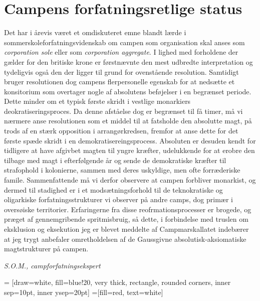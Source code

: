 \begin{minipage}[b]{0.95\linewidth}
\begin{minipage}[t]{0.47\textwidth}
\section*{Campens forfatningsretlige status}
Det har i årevis været et omdiskuteret emne blandt lærde i sommerskoleforfatningsvidenskab om campen som organisation skal anses som \emph{corporation sole} eller som \emph{corporation aggregate}. I lighed med forholdene der gælder for den britiske krone er førstnævnte den mest udbredte interpretation og tydeligvis også den der ligger til grund for ovenstående resolution. Samtidigt bruger resolutionen dog campens flerpersonelle egenskab for at nedsætte et konsitorium som overtager nogle af absolutens beføjelser i en begrænset periode. Dette minder om et typisk første skridt i vestlige monarkiers deokratiseringsproces. Da denne afståelse dog er begrænset til få timer, må vi nærmere anse resolutionen som et middel til at fatsholde den absolutte magt, på trods af en stærk opposition i arrangørkredsen, fremfor at anse dette for det første spæde skridt i en demokratisereingsprocess. Absoluten er desuden kendt for tidligere at have afgivbet magten til yngre kræfter, udelukkende for at erobre den tilbage med magt i efterfølgende år og sende de demokratiske kræfter til strafophold i kolonierne, sammen med deres uskyldige, men ofte forræderiske famile. Sammenfattende må vi derfor observere at campen forbliver monarkist, og dermed til stadighed er i et modsætningsforhold til de teknokratiske og oligarkiske forfatningsstrukturer vi observer på andre camps, dog primær i oversøiske territorier. Erfaringerne fra disse reofrmationsprocesser er brogede, og præget af gennemgribende spritmisbruig, så dette, i forbindelse med truslen om eksklusion og eksekution jeg er blevet meddelte af Campmarskallatet indebærer at jeg trygt anbefaler omretholdelsen af de Gaussgivne absolutisk-aksiomatiske magtstrukturer på campen.

{\flushright\emph{S.O.M., campforfatningsekspert}}

\end{minipage}
\hfill\begin{minipage}[t]{0.47\textwidth}

\vspace{1mm}
 = [draw=white, fill=blue!20, very thick,
    rectangle, rounded corners, inner sep=10pt, inner ysep=20pt]
 =[fill=red, text=white]


\end{minipage}
\end{minipage}
